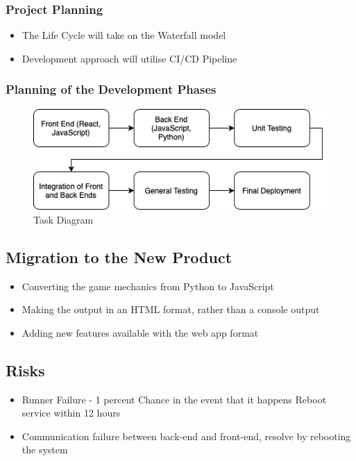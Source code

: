 \documentclass[12pt, titlepage]{article}
\begin{document}
\subsubsection{Project Planning}
\begin{itemize}
    \item The Life Cycle will take on the Waterfall model
    \item Development approach will utilise CI/CD Pipeline
\end{itemize}
\subsubsection{Planning of the Development Phases}
\begin{figure}[H]
    \caption{Task Diagram}
    \centering
    \includegraphics[width=0.95\linewidth]{task.png}
    \end{figure}

\subsection{Migration to the New Product}
\begin{itemize}
    \item Converting the game mechanics from Python to JavaScript
    \item Making the output in an HTML format, rather than a console output
    \item Adding new features available with the web app format
\end{itemize}

\subsection{Risks}
\begin{itemize}
    \item Runner Failure - 1 percent Chance in the event that it happens Reboot service within 12 hours
    \item Communication failure between back-end and front-end, resolve by rebooting the system
\end{itemize}
\end{document}
